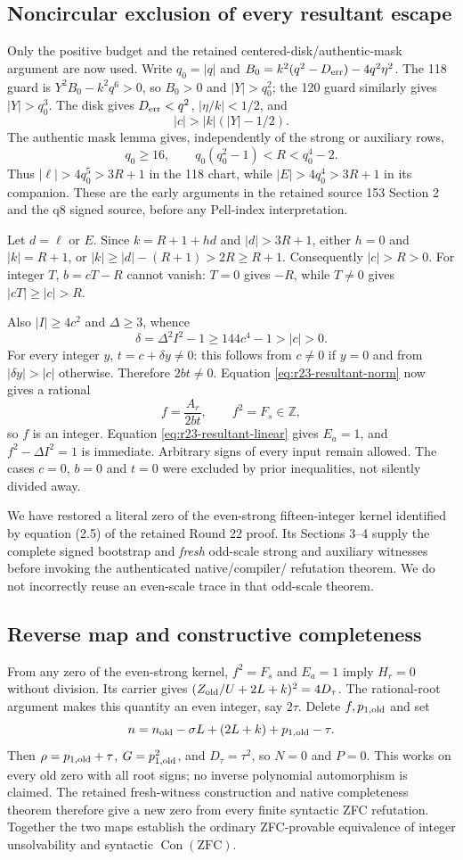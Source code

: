 \subsection{Noncircular exclusion of every resultant escape}
Only the positive budget and the retained centered-disk/authentic-mask argument
are now used. Write $q_0=|q|$ and
$B_0=k^2(q^2-D_{\rm err})-4q^2\eta^2$.
The 118 guard is $Y^2B_0-k^2q^6>0$, so $B_0>0$ and $|Y|>q_0^2$;
the 120 guard similarly gives $|Y|>q_0^3$. The disk gives
$D_{\rm err}<q^2$, $|\eta/k|<1/2$, and
\[
 |c|>|k|(|Y|-1/2).
\]
The authentic mask lemma gives, independently of the strong or auxiliary rows,
\[
 q_0\ge16,\qquad q_0(q_0^2-1)<R<q_0^4-2.
\]
Thus $|\ell|>4q_0^5>3R+1$ in the 118 chart, while $|E|>4q_0^4>3R+1$ in
its companion. These are the early arguments in the retained source 153
Section 2 and the q8 signed source, before any Pell-index interpretation.

Let $d=\ell$ or $E$. Since $k=R+1+hd$ and $|d|>3R+1$, either $h=0$
and $|k|=R+1$, or $|k|\ge|d|-(R+1)>2R\ge R+1$. Consequently
$|c|>R>0$. For integer $T$, $b=cT-R$ cannot vanish: $T=0$ gives $-R$,
while $T\ne0$ gives $|cT|\ge|c|>R$.

Also $|I|\ge4c^2$ and $\Delta\ge3$, whence
\[
 \delta=\Delta^2I^2-1\ge144c^4-1>|c|>0.
\]
For every integer $y$, $t=c+\delta y\ne0$: this follows from $c\ne0$ if
$y=0$ and from $|\delta y|>|c|$ otherwise. Therefore $2bt\ne0$.
Equation \eqref{eq:r23-resultant-norm} now gives a rational
\[
 f=\frac{A_r}{2bt},\qquad f^2=F_s\in\mathbb Z,
\]
so $f$ is an integer. Equation \eqref{eq:r23-resultant-linear} gives $E_a=1$,
and $f^2-\Delta I^2=1$ is immediate. Arbitrary signs of every input remain
allowed. The cases $c=0$, $b=0$ and $t=0$ were excluded by prior inequalities,
not silently divided away.

We have restored a literal zero of the even-strong fifteen-integer kernel
identified by equation (2.5) of the retained Round 22 proof. Its Sections 3--4
supply the complete signed bootstrap and \emph{fresh} odd-scale strong and
auxiliary witnesses before invoking the authenticated native/compiler/
refutation theorem. We do not incorrectly reuse an even-scale trace in that
odd-scale theorem.

\subsection{Reverse map and constructive completeness}
From any zero of the even-strong kernel, $f^2=F_s$ and $E_a=1$ imply $H_r=0$
without division. Its carrier gives
$(Z_{\rm old}/U+2L+k)^2=4D_\tau$. The rational-root argument makes this
quantity an even integer, say $2\tau$. Delete $f,p_{1,\rm old}$ and set
\[
 n=n_{\rm old}-\sigma L+(2L+k)+p_{1,\rm old}-\tau.
\]
Then $\rho=p_{1,\rm old}+\tau$, $G=p_{1,\rm old}^2$, and
$D_\tau=\tau^2$, so $N=0$ and $P=0$. This works on every old zero with
all root signs; no inverse polynomial automorphism is claimed.
The retained fresh-witness construction and native completeness theorem
therefore give a new zero from every finite syntactic ZFC refutation.
Together the two maps establish the ordinary ZFC-provable equivalence of
integer unsolvability and syntactic $\operatorname{Con}(\mathrm{ZFC})$.

